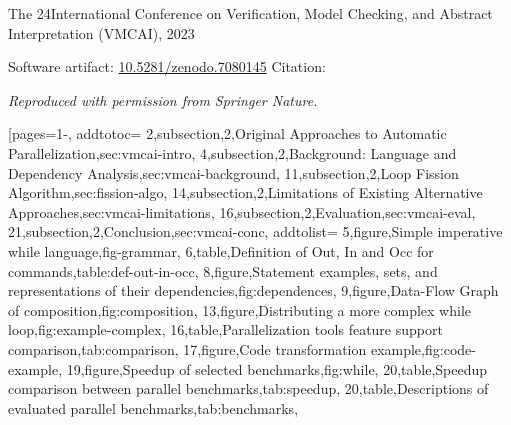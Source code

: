 \pageIconOpt
\ainfoX{\CTNT}
{The 24\thsup International Conference on Verification, Model Checking, and Abstract Interpretation (VMCAI), 2023}
{Software artifact: \href{https://zenodo.org/records/7080145}{10.5281/zenodo.7080145}\newline
Citation:~\cite{aubert202213}\par
\textit{Reproduced with permission from Springer Nature.}}
[pages={1-},
    addtotoc={
        2,subsection,2,{Original Approaches to Automatic Parallelization},sec:vmcai-intro,
        4,subsection,2,{Background: Language and Dependency Analysis},sec:vmcai-background,
        11,subsection,2,{Loop Fission Algorithm},sec:fission-algo,
        14,subsection,2,{Limitations of Existing Alternative Approaches},sec:vmcai-limitations,
        16,subsection,2,{Evaluation},sec:vmcai-eval,
        21,subsection,2,{Conclusion},sec:vmcai-conc},
    addtolist={
        5,figure,{Simple imperative while language},fig-grammar,
        6,table,{Definition of Out, In and Occ for commands},table:def-out-in-occ,
        8,figure,{Statement examples, sets, and representations of their dependencies},fig:dependences,
        9,figure,{Data-Flow Graph of composition},fig:composition,
        13,figure,{Distributing a more complex while loop},fig:example-complex,
        16,table,{Parallelization tools feature support comparison},tab:comparison,
        17,figure,{Code transformation example},fig:code-example,
        19,figure,{Speedup of selected benchmarks},fig:while,
        20,table,{Speedup comparison between parallel benchmarks},tab:speedup,
        20,table,{Descriptions of evaluated parallel benchmarks},tab:benchmarks},
